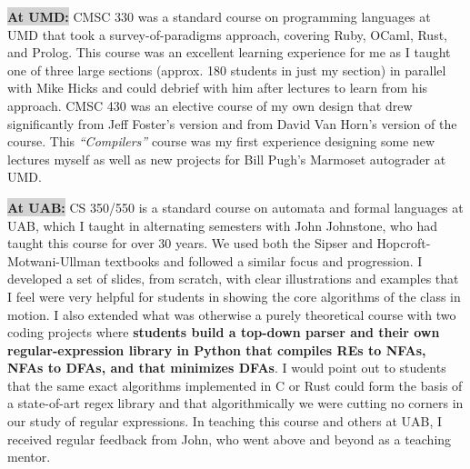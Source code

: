 \documentclass[12pt]{article}
\begin{document}
\colorbox{lightgray}{\textbf{At UMD:}} CMSC 330 was a standard course on programming languages at UMD that took a survey-of-paradigms approach, covering Ruby, OCaml, Rust, and Prolog. This course was an excellent learning experience for me as I taught one of three large sections (approx. 180 students in just my section) in parallel with Mike Hicks and could debrief with him after lectures to learn from his approach. CMSC 430 was an elective course of my own design that drew significantly from Jeff Foster's version and from David Van Horn's version of the course. This \emph{``Compilers''} course was my first experience designing some new lectures myself as well as new projects for Bill Pugh's Marmoset autograder at UMD. %

\colorbox{lightgray}{\textbf{At UAB:}} CS 350/550 is a standard course on automata and formal languages at UAB, which I taught in alternating semesters with John Johnstone, who had taught this course for over 30 years. We used both the Sipser and Hopcroft-Motwani-Ullman textbooks and followed a similar focus and progression. I developed a set of slides, from scratch, with clear illustrations and examples that I feel were very helpful for students in showing the core algorithms of the class in motion. I also extended what was otherwise a purely theoretical course with two coding projects where \textbf{students build a top-down parser and their own regular-expression library in Python that compiles REs to NFAs, NFAs to DFAs, and that minimizes DFAs}. I would point out to students that the same exact algorithms implemented in C or Rust could form the basis of a state-of-art regex library and that algorithmically we were cutting no corners in our study of regular expressions. In teaching this course and others at UAB, I received regular feedback from John, who went above and beyond as a teaching mentor.
\end{document}
